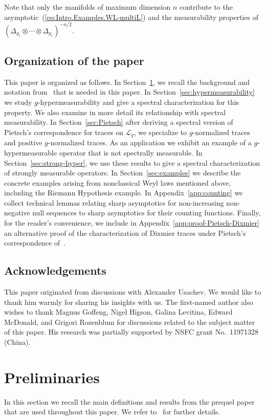 \documentclass[10pt, a4paper]{amsart}
\newcommand{\sL}{\mathscr{L}}
\numberwithin{equation}{section}
\theoremstyle{definition}
\theoremstyle{remark}
\begin{document}
Note that only the manifolds of maximum dimension $n$ contribute to the asymptotic~(\ref{eq:Intro.Examples.WL-multiL}) and the measurability properties of $(\Delta_{g_1}\otimes\cdots\otimes\Delta_{g_r})^{-n/2}$.

\subsection{Organization of the paper}
This paper is organized as follows. In Section~\ref{sec:prelim}, we recall the background and notation from~\cite{PT:Part1} that is needed in this paper.
In Section~\ref{sec:hypermeasurability} we study $g$-hypermeasurability and give a spectral characterization for this property. We also examine in more detail its relationship with spectral measurability.
In Section~\ref{sec:Pietsch} after deriving a spectral version of Pietsch's correspondence for traces on $\sL_g$, we specialize to $g$-normalized traces and positive $g$-normalized traces. As an application we exhibit an example of a $g$-hypermeasurable operator that is not spectrally measurable.  
In Section~\ref{sec:strong-hyper}, we use these results to give a spectral characterization of strongly measurable operators.
In Section~\ref{sec:examples} we describe the concrete examples arising from nonclassical Weyl laws mentioned above, including the Riemann Hypothesis example.
In Appendix~\ref{app:counting} we collect technical lemmas relating  sharp asymptotics for non-increasing non-negative null sequences to sharp asymptotics for their counting functions. Finally, for the reader's convenience, we include in Appendix~\ref{app:proof-Pietsch-Dixmier} an alternative proof of the characterization of Dixmier traces under Pietsch's correspondence of~\cite{LU:JMAA25}. 

\subsection*{Acknowledgements} This paper originated from discussions with Alexander Usachev. We would like to thank him warmly for sharing his insights with us. The first-named author also wishes to thank Magnus Goffeng, Nigel Higson, Galina Levitina, Edward McDonald, and Grigori Rozenblum for discussions related to the subject matter of this paper. His research was partially supported by NSFC grant No.~11971328 (China).

\section{Preliminaries}\label{sec:prelim}
In this section we recall the main definitions and results from the prequel paper~\cite{PT:Part1} that are used throughout this paper. We refer to~\cite{PT:Part1} for further details. 
\end{document}
